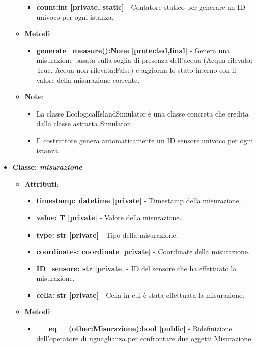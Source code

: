 \begin{itemize}
\begin{itemize}
    \begin{itemize}
        \item \textbf{count:int [private, static]} - Contatore statico per generare un ID univoco per ogni istanza.
    \end{itemize}
    \item    \textbf{Metodi}: 
    \begin{itemize}
        \item \textbf{generate\_measure():None [protected,final]} - Genera una misurazione basata sulla soglia di presenza dell'acqua (Acqua rilevata: True, Acqua non rilevata:False) e aggiorna lo stato interno con il valore della misurazione corrente.
    \end{itemize}
    \item    \textbf{Note}:
    \begin{itemize}
        \item La classe EcologicalIslandSimulator è una classe concreta che eredita dalla classe astratta Simulator.
        \item Il costruttore genera automaticamente un ID sensore univoco per ogni istanza.
    \end{itemize}
\end{itemize}
    \item{\textbf{Classe: \textit{misurazione}}}
    \begin{itemize}
        \item   \textbf{Attributi}: 
    \begin{itemize}
        \item \textbf{timestamp: datetime [private]} - Timestamp della misurazione.
        \item \textbf{value: T [private]} - Valore della misurazione.
        \item \textbf{type: str [private]} - Tipo della misurazione.
        \item \textbf{coordinates: coordinate [private]} - Coordinate della misurazione.
        \item \textbf{ID\_sensore: str [private]} - ID del sensore che ha effettuato la misurazione.
        \item \textbf{cella: str [private]} - Cella in cui è stata effettuata la misurazione.
    \end{itemize}
    \item   \textbf{Metodi}: 
    \begin{itemize}
        \item \textbf{\_\_eq\_\_(other:Misurazione):bool [public]} - Ridefinizione dell'operatore di uguaglianza per confrontare due oggetti Misurazione.

\end{itemize}
\end{itemize}
\end{itemize}
